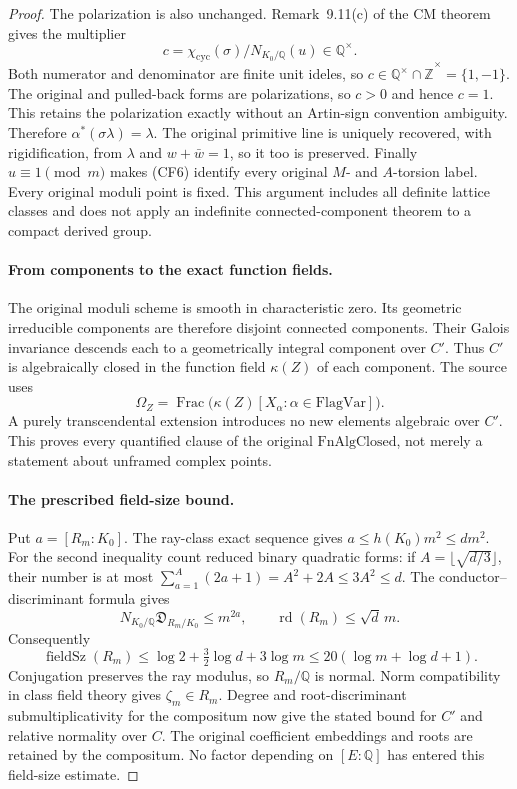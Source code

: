 \begin{proof}
The polarization is also unchanged.  Remark~9.11(c) of the CM
theorem gives the multiplier
\[
 c=\chi_{\mathrm{cyc}}(\sigma)/N_{K_0/\mathbb Q}(u)
                                      \in\mathbb Q^\times.
\]
Both numerator and denominator are finite unit ideles, so
$c\in\mathbb Q^\times\cap\widehat{\mathbb Z}^{\times}
=\{1,-1\}$.  The original and pulled-back forms are
polarizations, so $c>0$ and hence $c=1$.  This retains the
polarization exactly without an Artin-sign convention ambiguity.
Therefore
$\alpha^*(\sigma\lambda)=\lambda$.  The original primitive line
is uniquely recovered, with rigidification, from $\lambda$ and
$w+\bar w=1$, so it too is preserved.  Finally $u\equiv1\pmod m$
makes (CF6) identify every original $M$- and $A$-torsion label.
Every original moduli point is fixed.  This argument includes all
definite lattice classes and does not apply an indefinite
connected-component theorem to a compact derived group.

\paragraph{From components to the exact function fields.}
The original moduli scheme is smooth in characteristic zero.
Its geometric irreducible components are therefore disjoint connected
components.  Their Galois invariance descends each to a geometrically
integral component over $C'$.  Thus $C'$ is algebraically closed in
the function field $\kappa(Z)$ of each component.  The source uses
\[
 \Omega_Z=\operatorname{Frac}
               \bigl(\kappa(Z)[X_\alpha:\alpha\in\mathrm{FlagVar}]\bigr).
\]
A purely transcendental extension introduces no new elements
algebraic over $C'$.  This proves every quantified clause of the
original $\mathrm{FnAlgClosed}$, not merely a statement about
unframed complex points\cite{component-field-source}.

\paragraph{The prescribed field-size bound.}
Put $a=[R_m:K_0]$.  The ray-class exact sequence gives
$a\leq h(K_0)m^2\leq dm^2$.
For the second inequality count reduced binary quadratic forms:
if $A=\lfloor\sqrt{d/3}\rfloor$, their number is at most
$\sum_{a=1}^{A}(2a+1)=A^2+2A\leq3A^2\leq d$.
The conductor--discriminant formula gives
\[
 N_{K_0/\mathbb Q}\mathfrak D_{R_m/K_0}\leq m^{2a},
 \qquad \operatorname{rd}(R_m)\leq\sqrt d\,m.
\]
Consequently
\[
 \operatorname{fieldSz}(R_m)
   \leq\log2+\tfrac32\log d+3\log m
   \leq20(\log m+\log d+1).
\]
Conjugation preserves the ray modulus, so $R_m/\mathbb Q$ is
normal.  Norm compatibility in class field theory gives
$\zeta_m\in R_m$.  Degree and root-discriminant submultiplicativity
for the compositum now give the stated bound for $C'$ and relative
normality over $C$.  The original coefficient embeddings and roots
are retained by the compositum.  No factor depending on $[E:\mathbb Q]$
has entered this field-size estimate.
\end{proof}

